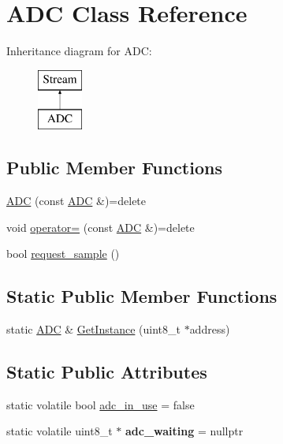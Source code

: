 \hypertarget{class_a_d_c}{\section{A\-D\-C Class Reference}
\label{class_a_d_c}
}
Inheritance diagram for A\-D\-C\-:\begin{figure}[H]
\begin{center}
\leavevmode
\includegraphics[height=2.000000cm]{class_a_d_c}
\end{center}
\end{figure}
\subsection*{Public Member Functions}
\begin{DoxyCompactItemize}
\item 
\hyperlink{class_a_d_c_a50cb1d4e5bb8e3812732d9efdde4af67}{A\-D\-C} (const \hyperlink{class_a_d_c}{A\-D\-C} \&)=delete
\item 
void \hyperlink{class_a_d_c_a8cc7efa85ad7492480bdfd9f49039150}{operator=} (const \hyperlink{class_a_d_c}{A\-D\-C} \&)=delete
\item 
bool \hyperlink{class_a_d_c_a8264cbf9141f229f5117718e78f01173}{request\-\_\-sample} ()
\end{DoxyCompactItemize}
\subsection*{Static Public Member Functions}
\begin{DoxyCompactItemize}
\item 
static \hyperlink{class_a_d_c}{A\-D\-C} \& \hyperlink{class_a_d_c_a08b7fedaf7538612368312d6d656009d}{Get\-Instance} (uint8\-\_\-t $\ast$address)
\end{DoxyCompactItemize}
\subsection*{Static Public Attributes}
\begin{DoxyCompactItemize}
\item 
static volatile bool \hyperlink{class_a_d_c_a13bcfd20fa1d5e80520e1485ac736afe}{adc\-\_\-in\-\_\-use} = false
\item 
\hypertarget{class_a_d_c_a472fee5492ee8e10d5baf38b67db18af}{static volatile uint8\-\_\-t $\ast$ {\bfseries adc\-\_\-waiting} = nullptr}\label{class_a_d_c_a472fee5492ee8e10d5baf38b67db18af}

\end{DoxyCompactItemize}
